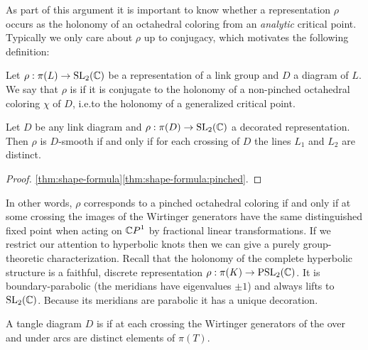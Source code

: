 \documentclass[leqno]{sl2art}
\begin{document}
As part of this argument it is important to know whether a representation \(\rho\) occurs as the holonomy of an octahedral coloring from an \emph{analytic} critical point.
Typically we only care about \(\rho\) up to conjugacy, which motivates the following definition:

\begin{definition}
  Let \(\rho : \pi(L) \to \operatorname{SL}_2(\mathbb{C})\) be a representation of a link group and \(D\) a diagram of \(L\).
  We say that \(\rho\) is  if it is conjugate to the holonomy of a non-pinched octahedral coloring \(\chi\) of \(D\), i.e.\@ to the holonomy of a generalized critical point.
\end{definition}

\begin{corollary}
  \label{thm:detection-condition}
  Let \(D\) be any link diagram and \(\rho : \pi(D) \to \operatorname{SL}_2(\mathbb{C})\) a decorated representation.
  Then \(\rho\) is \(D\)-smooth if and only if for each crossing of \(D\) the lines \(L_1\) and \(L_2\) are distinct.
\end{corollary}

\begin{proof}
  \cref{thm:shape-formula}\ref{thm:shape-formula:pinched}.
\end{proof}

In other words, \(\rho\) corresponds to a pinched octahedral coloring if and only if at some crossing the images of the Wirtinger generators have the same distinguished fixed point when acting on \(\psp\) by fractional linear transformations.
If we restrict our attention to hyperbolic knots then we can give a purely group-theoretic characterization.
Recall that the holonomy of the complete hyperbolic structure is a faithful, discrete representation \(\rho : \pi(K) \to \operatorname{PSL}_2(\mathbb{C})\).
It is boundary-parabolic (the meridians have eigenvalues \(\pm 1\)) and always lifts to \(\operatorname{SL}_2(\mathbb{C})\).
Because its meridians are parabolic it has a unique decoration.

\begin{definition}
  A tangle diagram \(D\) is  if at each crossing the Wirtinger generators of the over and under arcs are distinct elements of \(\pi(T)\).%
\end{definition}
\end{document}
